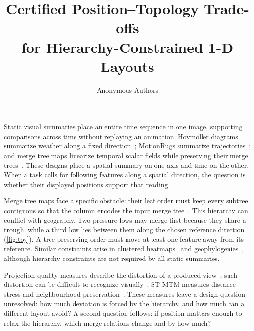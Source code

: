 \documentclass[review]{vgtc}                 %
\title{Certified Position--Topology Trade-offs\\for Hierarchy-Constrained 1-D Layouts}
\author{Anonymous Authors}   %
\begin{document}
\maketitle

Static visual summaries place an entire time sequence in one image, supporting comparisons across time without replaying an animation. Hovm\"oller diagrams summarize weather along a fixed direction~\cite{Hovmoller:1949}; MotionRugs summarize trajectories~\cite{Buchmueller:2019:MR}; and merge tree maps linearize temporal scalar fields while preserving their merge trees~\cite{Koepp:2023:TMTM,STMTM:2026}. These designs place a spatial summary on one axis and time on the other. When a task calls for following features along a spatial direction, the question is whether their displayed positions support that reading.

Merge tree maps face a specific obstacle: their leaf order must keep every subtree contiguous so that the column encodes the input merge tree~\cite{Koepp:2023:TMTM}. This hierarchy can conflict with geography. Two pressure lows may merge first because they share a trough, while a third low lies between them along the chosen reference direction (\cref{fig:toy}). A tree-preserving order must move at least one feature away from its reference. Similar constraints arise in clustered heatmaps~\cite{Eisen:1998:CA} and geophylogenies~\cite{Klawitter:2025:GP}, although hierarchy constraints are not required by all static summaries.

Projection quality measures describe the distortion of a produced view~\cite{Venna:2001:NP,Aupetit:2007:VD}; such distortion can be difficult to recognize visually~\cite{McNutt:2020:SVM,Wattenberg:2016:TSNE}. ST-MTM measures distance stress and neighbourhood preservation~\cite{STMTM:2026}. These measures leave a design question unresolved: how much deviation is forced by the hierarchy, and how much can a different layout avoid? A second question follows: if position matters enough to relax the hierarchy, which merge relations change and by how much?
\end{document}
